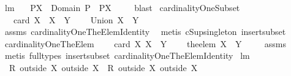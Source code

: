 \begin{isabellebody}
\isanewline
{}\isamarkupfalse%
\ lm{}{}{}{\isacharcolon}\ \isanewline
\ \ {\isachardoublequoteopen}P{\isacharbackquote}{\isacharbackquote}{\isacharparenleft}X\ {\isasyminter}\ Domain\ P{\isacharparenright}\ {\isacharequal}\ P{\isacharbackquote}{\isacharbackquote}X{\isachardoublequoteclose}\ \isanewline
%
\isadelimproof
\ \ %
\endisadelimproof
%
\isatagproof
{}\isamarkupfalse%
\ blast%
\endisatagproof
{\isafoldproof}%
%
\isadelimproof
\isanewline
%
\endisadelimproof
\isanewline
{}\isamarkupfalse%
\ cardinalityOneSubset{\isacharcolon}\ \isanewline
\ \ \ {\isachardoublequoteopen}card\ X{\isacharequal}{}{\isachardoublequoteclose}\ \ {\isachardoublequoteopen}X\ {\isasymsubseteq}\ Y{\isachardoublequoteclose}\ \isanewline
\ \ \ {\isachardoublequoteopen}Union\ X\ {\isasymin}\ Y{\isachardoublequoteclose}\ \isanewline
%
\isadelimproof
\ \ %
\endisadelimproof
%
\isatagproof
{}\isamarkupfalse%
\ assms\ cardinalityOneTheElemIdentity\ \isamarkupfalse%
\ {\isacharparenleft}metis\ cSup{\isacharunderscore}singleton\ insert{\isacharunderscore}subset{\isacharparenright}%
\endisatagproof
{\isafoldproof}%
%
\isadelimproof
\isanewline
%
\endisadelimproof
\isanewline
{}\isamarkupfalse%
\ cardinalityOneTheElem{\isacharcolon}\ \isanewline
\ \ \ {\isachardoublequoteopen}card\ X{\isacharequal}{}{\isachardoublequoteclose}\ {\isachardoublequoteopen}X\ {\isasymsubseteq}\ Y{\isachardoublequoteclose}\ \isanewline
\ \ \ {\isachardoublequoteopen}the{\isacharunderscore}elem\ X\ {\isasymin}\ Y{\isachardoublequoteclose}\ \isanewline
%
\isadelimproof
\ \ %
\endisadelimproof
%
\isatagproof
{}\isamarkupfalse%
\ assms\ \isamarkupfalse%
\ {\isacharparenleft}metis\ {\isacharparenleft}full{\isacharunderscore}types{\isacharparenright}\ insert{\isacharunderscore}subset\ cardinalityOneTheElemIdentity{\isacharparenright}%
\endisatagproof
{\isafoldproof}%
%
\isadelimproof
\isanewline
%
\endisadelimproof
\isanewline
{}\isamarkupfalse%
\ lm{}{}{}{\isacharcolon}\ \isanewline
\ \ {\isachardoublequoteopen}{\isacharparenleft}R\ outside\ X{}{\isacharparenright}\ outside\ X{}\ {\isacharequal}\ {\isacharparenleft}R\ outside\ X{}{\isacharparenright}\ outside\ X{}{\isachardoublequoteclose}\ \isanewline
%
\isadelimproof
\ \ %
\endisadelimproof
%

\end{isabellebody}
